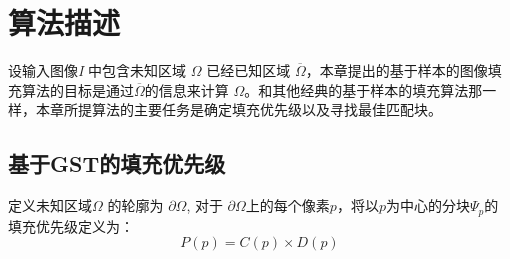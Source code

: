 \section{算法描述}
\label{algorithm}
设输入图像\emph{I} 中包含未知区域 \(\Omega\) 已经已知区域 \(\overline{\Omega}\)，本章提出的基于样本的图像填充算法的目标是通过\(\overline{\Omega}\)的信息来计算 \(\Omega\)。和其他经典的基于样本的填充算法那一样，本章所提算法的主要任务是确定填充优先级以及寻找最佳匹配块。
\subsection{基于GST的填充优先级}
\label{sec:sub:GST}

定义未知区域\(\Omega\) 的轮廓为 \(\partial\Omega\), 对于 \(\partial\Omega\)上的每个像素\(p\)，将以\(p\)为中心的分块\(\Psi_p\)的填充优先级定义为：
\begin{equation}
   \label{equ:chap3:order}
   P(p)=C(p)\times D(p)
\end{equation}

